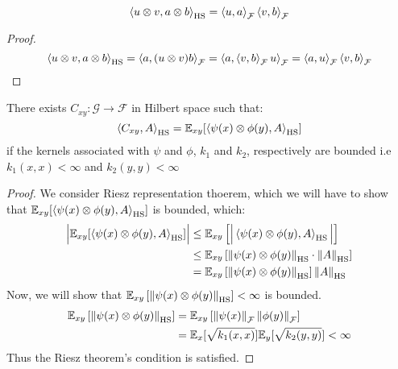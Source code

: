 \begin{corollary}
    \begin{equation*}
        \left\langle u\otimes v, a\otimes b \right\rangle_{\operatorname{HS}} = \left\langle u, a \right\rangle_\mathcal{F}\left\langle v, b \right\rangle_\mathcal{F}
    \end{equation*}
\end{corollary}
\begin{proof}
    \begin{equation*}
        \left\langle u\otimes v, a\otimes b \right\rangle_{\operatorname{HS}} = \left\langle a, (u\otimes v)b \right\rangle_\mathcal{F} = \left\langle a, \left\langle v, b \right\rangle_\mathcal{F}u \right\rangle_\mathcal{F} = \left\langle a, u \right\rangle_\mathcal{F}\left\langle v, b \right\rangle_\mathcal{F}
    \end{equation*}
\end{proof}

\begin{theorem}
    There exists $C_{xy}:\mathcal{G}\rightarrow\mathcal{F}$ in Hilbert space such that:
    \begin{equation*}
        \left\langle C_{xy}, A \right\rangle_{\operatorname{HS}} = \mathbb{E}_{xy}[\left\langle \psi(x)\otimes\phi(y), A \right\rangle_{\operatorname{HS}}]
    \end{equation*}
    if the kernels associated with $\psi$ and $\phi$, $k_1$ and $k_2$, respectively are bounded i.e $k_1(x,x) < \infty$ and $k_2(y,y)<\infty$
\end{theorem}
\begin{proof}
    We consider Riesz representation thoerem, which we will have to show that $\mathbb{E}_{xy}[\left\langle \psi(x)\otimes\phi(y), A \right\rangle_{\operatorname{HS}}]$ is bounded, which:
    \begin{equation*}
    \begin{aligned}
        \Big|\mathbb{E}_{xy}[\left\langle \psi(x)\otimes\phi(y), A \right\rangle_{\operatorname{HS}}]\Big| &\le \mathbb{E}_{xy}\left[ \Big|\left\langle \psi(x)\otimes\phi(y), A \right\rangle_{\operatorname{HS}} \Big| \right] \\
        &\le \mathbb{E}_{xy}\left[ \left\lVert\psi(x)\otimes\phi(y)\right\rVert_{\operatorname{HS}}\cdot\left\lVert A\right\rVert_{\operatorname{HS}} \right] \\
        &= \mathbb{E}_{xy}\left[ \left\lVert\psi(x)\otimes\phi(y)\right\rVert_{\operatorname{HS}} \right]\left\lVert A\right\rVert_{\operatorname{HS}} \\
    \end{aligned}
    \end{equation*}
    Now, we will show that $\mathbb{E}_{xy}\left[ \left\lVert\psi(x)\otimes\phi(y)\right\rVert_{\operatorname{HS}} \right] <\infty$ is bounded. 
    \begin{equation*}
    \begin{aligned}
        \mathbb{E}_{xy}\left[ \left\lVert\psi(x)\otimes\phi(y)\right\rVert_{\operatorname{HS}} \right] &= \mathbb{E}_{xy}\left[ \left\lVert\psi(x)\right\rVert_\mathcal{F}\left\lVert\phi(y)\right\rVert_\mathcal{F} \right] \\
        &= \mathbb{E}_x[\sqrt{k_1(x,x)}]\mathbb{E}_y[\sqrt{k_2(y,y)}] < \infty
    \end{aligned}
    \end{equation*}
    Thus the Riesz theorem's condition is satisfied.
\end{proof}

